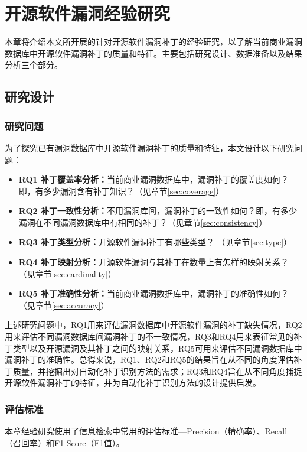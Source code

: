 \chapter{开源软件漏洞经验研究}\label{sec:study}

本章将介绍本文所开展的针对开源软件漏洞补丁的经验研究，以了解当前商业漏洞数据库中开源软件漏洞补丁的质量和特征。主要包括研究设计、数据准备以及结果分析三个部分。


\section{研究设计}
\subsection{研究问题}
为了探究已有漏洞数据库中开源软件漏洞补丁的质量和特征，本文设计以下研究问题：

\begin{itemize}[leftmargin=*]
    \item \textbf{RQ1 补丁覆盖率分析：}当前商业漏洞数据库中，漏洞补丁的覆盖度如何？即，有多少漏洞含有补丁知识？（见章节\ref{sec:coverage}）
    \item \textbf{RQ2 补丁一致性分析：}不用漏洞库间，漏洞补丁的一致性如何？即，有多少漏洞在不同漏洞数据库中有相同的补丁？（见章节\ref{sec:consistency}）
    \item \textbf{RQ3 补丁类型分析：}开源软件漏洞补丁有哪些类型？ （见章节\ref{sec:type}）
    \item \textbf{RQ4 补丁映射分析：}开源软件漏洞与其补丁在数量上有怎样的映射关系？ （见章节\ref{sec:cardinality}）
    \item \textbf{RQ5 补丁准确性分析：}当前商业漏洞数据库中，漏洞补丁的准确性如何？ （见章节\ref{sec:accuracy}）
\end{itemize}
    
上述研究问题中，RQ1用来评估漏洞数据库中开源软件漏洞的补丁缺失情况，RQ2用来评估不同漏洞数据库间漏洞补丁的不一致情况，RQ3和RQ4用来表征常见的补丁类型以及开源漏洞及其补丁之间的映射关系，RQ5可用来评估不同漏洞数据库中漏洞补丁的准确性。总得来说，RQ1、RQ2和RQ5的结果旨在从不同的角度评估补丁质量，并挖掘出对自动化补丁识别方法的需求；RQ3和RQ4旨在从不同角度捕捉开源软件漏洞补丁的特征，并为自动化补丁识别方法的设计提供启发。

\subsection{评估标准}\label{sec:metric}
本章经验研究使用了信息检索中常用的评估标准---Precision（精确率）、Recall（召回率）和F1-Score（F1值）。

